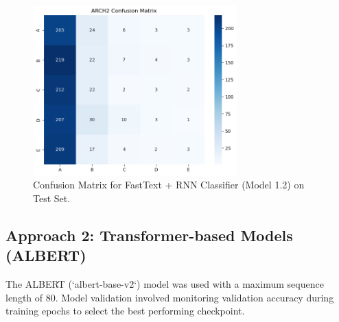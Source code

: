 \documentclass[10.5pt]{article}
\begin{document}
\begin{figure}[htbp]
    \centering
    \includegraphics[width=0.7\textwidth]{images/model1_2_confusion_matrix.png}
    \caption{Confusion Matrix for FastText + RNN Classifier (Model 1.2) on Test Set.}
    \label{fig:conf_matrix_model1_2}
\end{figure}

\subsection{Approach 2: Transformer-based Models (ALBERT)}
The ALBERT (`albert-base-v2`) model was used with a maximum sequence length of 80. Model validation involved monitoring validation accuracy during training epochs to select the best performing checkpoint.
\end{document}
